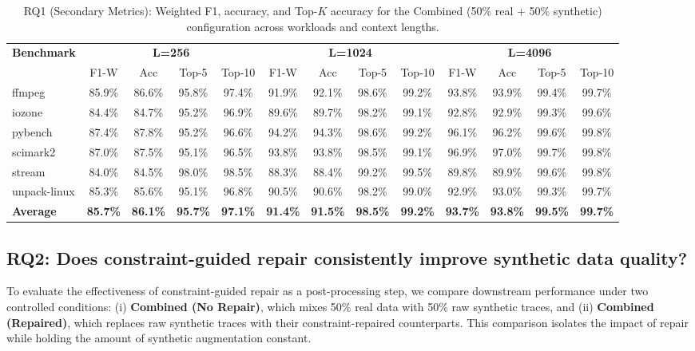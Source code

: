 \begin{table}[t]
\centering
\caption{RQ1 (Secondary Metrics): Weighted F1, accuracy, and Top-$K$ accuracy for the Combined (50\% real + 50\% synthetic) configuration across workloads and context lengths.}
\label{tab:rq1-secondary}
\footnotesize
\setlength{\tabcolsep}{3.5pt}
\begin{tabular}{@{}lcccccccccccc@{}}
\toprule
\multirow{2}{*}{\textbf{Benchmark}} & \multicolumn{4}{c}{\textbf{L=256}} & \multicolumn{4}{c}{\textbf{L=1024}} & \multicolumn{4}{c}{\textbf{L=4096}} \\
\cmidrule(lr){2-5} \cmidrule(lr){6-9} \cmidrule(lr){10-13}
& F1-W & Acc & Top-5 & Top-10 & F1-W & Acc & Top-5 & Top-10 & F1-W & Acc & Top-5 & Top-10 \\
\midrule
ffmpeg       & 85.9\% & 86.6\% & 95.8\% & 97.4\% & 91.9\% & 92.1\% & 98.6\% & 99.2\% & 93.8\% & 93.9\% & 99.4\% & 99.7\% \\
iozone       & 84.4\% & 84.7\% & 95.2\% & 96.9\% & 89.6\% & 89.7\% & 98.2\% & 99.1\% & 92.8\% & 92.9\% & 99.3\% & 99.6\% \\
pybench      & 87.4\% & 87.8\% & 95.2\% & 96.6\% & 94.2\% & 94.3\% & 98.6\% & 99.2\% & 96.1\% & 96.2\% & 99.6\% & 99.8\% \\
scimark2     & 87.0\% & 87.5\% & 95.1\% & 96.5\% & 93.8\% & 93.8\% & 98.5\% & 99.1\% & 96.9\% & 97.0\% & 99.7\% & 99.8\% \\
stream       & 84.0\% & 84.5\% & 98.0\% & 98.5\% & 88.3\% & 88.4\% & 99.2\% & 99.5\% & 89.8\% & 89.9\% & 99.6\% & 99.8\% \\
unpack-linux & 85.3\% & 85.6\% & 95.1\% & 96.8\% & 90.5\% & 90.6\% & 98.2\% & 99.0\% & 92.9\% & 93.0\% & 99.3\% & 99.7\% \\
\midrule
\textbf{Average} & \textbf{85.7\%} & \textbf{86.1\%} & \textbf{95.7\%} & \textbf{97.1\%} & \textbf{91.4\%} & \textbf{91.5\%} & \textbf{98.5\%} & \textbf{99.2\%} & \textbf{93.7\%} & \textbf{93.8\%} & \textbf{99.5\%} & \textbf{99.7\%} \\
\bottomrule
\end{tabular}
\end{table}

\subsection{RQ2: Does constraint-guided repair consistently improve synthetic data quality?}
\label{sec:rq2}

To evaluate the effectiveness of constraint-guided repair as a post-processing step, we compare downstream performance under two controlled conditions:
(i) \textbf{Combined (No Repair)}, which mixes 50\% real data with 50\% raw synthetic traces, and
(ii) \textbf{Combined (Repaired)}, which replaces raw synthetic traces with their constraint-repaired counterparts.
This comparison isolates the impact of repair while holding the amount of synthetic augmentation constant.


